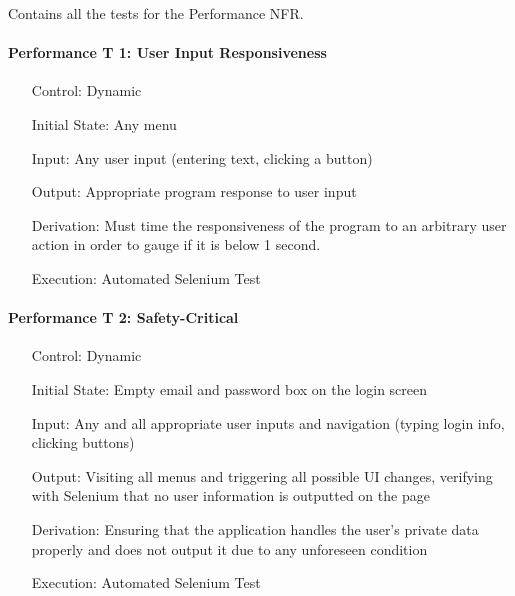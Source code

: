 \documentclass[12pt, titlepage]{article}
\begin{document}
Contains all the tests for the Performance NFR.

\paragraph*{Performance T 1: User Input Responsiveness}
\begin{itemize}
	\item[Control:] Dynamic
	\item[Initial State:] Any menu
	\item[Input:] Any user input (entering text, clicking a button)
	\item[Output:] Appropriate program response to user input
	\item[Derivation:] Must time the responsiveness of the program to an arbitrary user action in order to gauge if it is below 1 second.
	\item[Execution:] Automated Selenium Test
\end{itemize}

\paragraph*{Performance T 2: Safety-Critical}
\begin{itemize}
	\item[Control:] Dynamic
	\item[Initial State:] Empty email and password box on the login screen
	\item[Input:] Any and all appropriate user inputs and navigation (typing login info, clicking buttons)
	\item[Output:] Visiting all menus and triggering all possible UI changes, verifying with Selenium that no user information is outputted on the page
	\item[Derivation:] Ensuring that the application handles the user's private data properly and does not output it due to any unforeseen condition
	\item[Execution:] Automated Selenium Test
\end{itemize}
\end{document}
